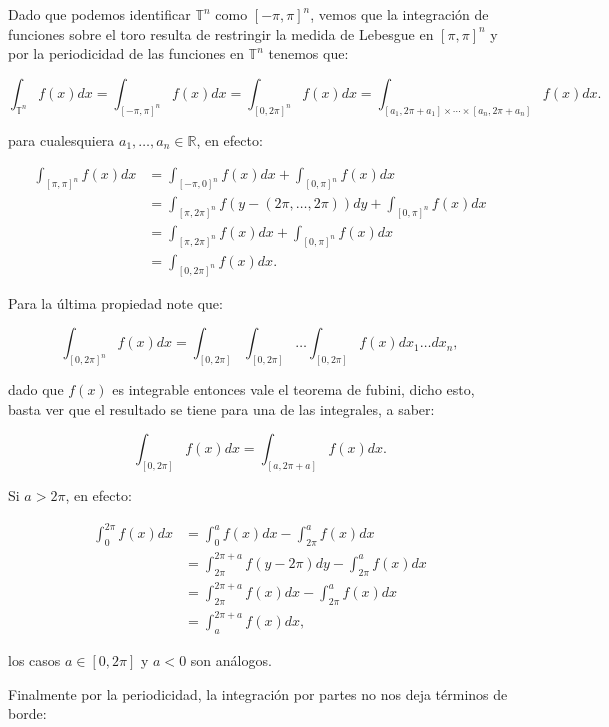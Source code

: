 \documentclass[12pt]{article}
\newcommand\R{\ensuremath{\mathbb{R}}}
\begin{document}
\begin{note}
    Dado que  podemos identificar $\mathbb{T}^n$ como $[-\pi,\pi]^n$, vemos que la integración de funciones sobre el toro resulta de restringir la medida de Lebesgue en $[\pi,\pi]^n$ y por la periodicidad de las funciones en $\mathbb{T}^n$ tenemos que:

    $$\int_{\mathbb{T}^n} f(x) d x=\int_{[-\pi,\pi]^n} f(x) d x=\int_{[0,2\pi]^n} f(x) d x=\int_{\left[a_1, 2\pi+a_1\right] \times \cdots \times\left[a_n, 2\pi+a_n\right]} f(x) d x.$$


    para cualesquiera $a_1,\ldots,a_n \in \R$, en efecto:

    $$\begin{aligned}
    \int_{[\pi, \pi]^n} f(x) d x & =\int_{[-\pi, 0]^n} f(x) d x+\int_{[0, \pi]^n} f(x) d x \\
     & =\int_{[\pi, 2 \pi]^n} f(y-(2 \pi,\ldots,2\pi)) d y+\int_{[0, \pi]^n} f(x) d x \\
    & =\int_{[\pi, 2 \pi]^n} f(x) d x+\int_{[0, \pi]^n} f(x) d x\\
    &=\int_{[0,2\pi]^n} f(x) d x.
    \end{aligned}$$

Para la última propiedad note que:

$$\int_{[0,2\pi]^ n}f(x)dx=\int_{[0,2\pi]}\int_{[0,2\pi]}\ldots\int_{[0,2\pi]}f(x) dx_1\ldots dx_n,$$

dado que $f(x)$ es integrable entonces vale el teorema de fubini, dicho esto, basta ver que el resultado se tiene para una de las integrales, a saber:

$$\int_{[0,2\pi]}f(x)dx=\int_{[a,2\pi+a]}f(x)dx.$$

Si $a>2\pi$, en efecto:

\begin{align*}
    \int_0^{2\pi}f(x)dx&=\int_0^af(x)dx-\int_{2\pi}^af(x) dx\\
    &=\int_{2\pi}^{2\pi+a}f(y-2\pi)dy-\int_{2\pi}^af(x)dx\\
    &=\int_{2\pi}^{2\pi+a}f(x)dx-\int_{2\pi}^af(x)dx\\
    &=\int_a^{2\pi+a}f(x)dx
,\end{align*}

los casos $a\in [0,2\pi]$ y $a<0$ son análogos.
\end{note}

Finalmente por la periodicidad, la integración por partes no nos deja términos de borde:
\end{document}
